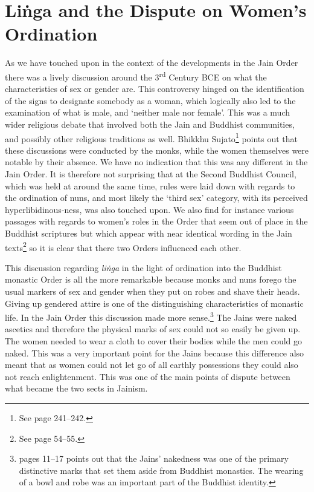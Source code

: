 \section{Liṅga and the Dispute on Women's Ordination}
\label{linga}

As we have touched upon in the context of the developments in the Jain Order there was a lively discussion around the 3\textsuperscript{rd} Century BCE on what the characteristics of sex or gender are. This controversy hinged on the identification of the signs to designate somebody as a woman, which logically also led to the examination of what is male, and `neither male nor female'. This was a much wider religious debate that involved both the Jain and Buddhist communities, and possibly other religious traditions as well. Bhikkhu Sujato\footnote{See \cite{sujato2009} page 241–242.} points out that these discussions were conducted by the monks, while the women themselves were notable by their absence. We have no indication that this was any different in the Jain Order. It is therefore not surprising that at the Second Buddhist Council, which was held at around the same time, rules were laid down with regards to the ordination of nuns, and most likely the `third sex' category, with its perceived hyperlibidinous-ness, was also touched upon. We also find for instance various passages with regards to women's roles in the Order that seem out of place in the Buddhist scriptures but which appear with near identical wording in the Jain texts\footnote{See \cite{sujato2009} page 54–55.} so it is clear that there two Orders influenced each other.

This discussion regarding {\em liṅga} in the light of ordination into the Buddhist monastic Order is all the more remarkable because monks and nuns forego the usual markers of sex and gender when they put on robes and shave their heads. Giving up gendered attire is one of the distinguishing characteristics of monastic life. In the Jain Order this discussion made more sense.\footnote{\cite{maes2016} pages 11–17 points out that the Jains' nakedness was one of the primary distinctive marks that set them aside from Buddhist monastics. The wearing of a bowl and robe was an important part of the Buddhist identity.} The Jains were naked ascetics and therefore the physical marks of sex could not so easily be given up. The women needed to wear a cloth to cover their bodies while the men could go naked. This was a very important point for the Jains because this difference also meant that as women could not let go of all earthly possessions they could also not reach enlightenment. This was one of the main points of dispute between what became the two sects in Jainism.

